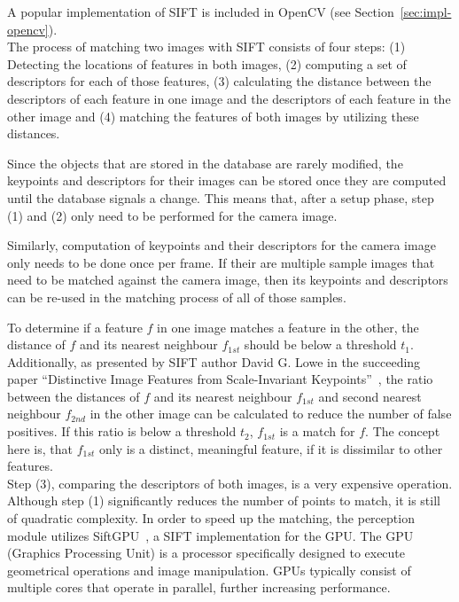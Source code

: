 A popular implementation of SIFT is included in OpenCV (see Section~\ref{sec:impl-opencv}).\\

The process of matching two images with SIFT consists of four steps: (1) Detecting the locations of features in both images, (2) computing a set of descriptors for each of those features, (3) calculating the distance between the descriptors of each feature in one image and the descriptors of each feature in the other image and (4) matching the features of both images by utilizing these distances.

Since the objects that are stored in the database are rarely modified, the keypoints and descriptors for their images can be stored once they are computed until the database signals a change. This means that, after a setup phase, step (1) and (2) only need to be performed for the camera image.

Similarly, computation of keypoints and their descriptors for the camera image only needs to be done once per frame. If their are multiple sample images that need to be matched against the camera image, then its keypoints and descriptors can be re-used in the matching process of all of those samples.

To determine if a feature $f$ in one image matches a feature in the other, the distance of $f$ and its nearest neighbour $f_{1st}$ should be below a threshold $t_1$. Additionally, as presented by SIFT author David G. Lowe in the succeeding paper ``Distinctive Image Features from Scale-Invariant Keypoints''~\cite{image_features_lowe}, the ratio between the distances of $f$ and its nearest neighbour $f_{1st}$ and second nearest neighbour $f_{2nd}$ in the other image can be calculated to reduce the number of false positives. If this ratio is below a threshold $t_2$, $f_{1st}$ is a match for $f$. The concept here is, that $f_{1st}$ only is a distinct, meaningful feature, if it is dissimilar to other features. \\

Step (3), comparing the descriptors of both images, is a very expensive operation. Although step (1) significantly reduces the number of points to match, it is still of quadratic complexity. In order to speed up the matching, the perception module utilizes SiftGPU~\cite{siftgpu07wu}, a SIFT implementation for the GPU. The GPU (Graphics Processing Unit) is a processor specifically designed to execute geometrical operations and image manipulation. GPUs typically consist of multiple cores that operate in parallel, further increasing performance. 

